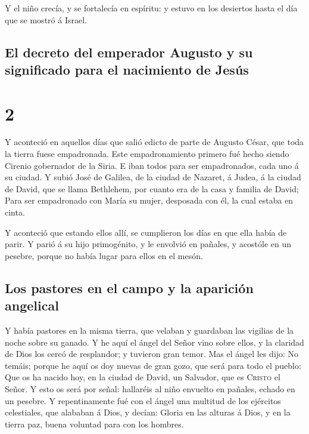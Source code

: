  Y el niño crecía, y se fortalecía en espíritu: y estuvo
en los desiertos hasta el día que se mostró á Israel.

\hypertarget{el-decreto-del-emperador-augusto-y-su-significado-para-el-nacimiento-de-jesuxfas}{%
\subsection{El decreto del emperador Augusto y su significado para el
nacimiento de
Jesús}\label{el-decreto-del-emperador-augusto-y-su-significado-para-el-nacimiento-de-jesuxfas}}

\hypertarget{section-1}{%
\section{2}\label{section-1}}

 Y aconteció en aquellos días que salió edicto de parte de
Augusto César, que toda la tierra fuese empadronada.  Este
empadronamiento primero fué hecho siendo Cirenio gobernador de la Siria.
 E iban todos para ser empadronados, cada uno á su ciudad.
 Y subió José de Galilea, de la ciudad de Nazaret, á
Judea, á la ciudad de David, que se llama Bethlehem, por cuanto era de
la casa y familia de David;  Para ser empadronado con
María su mujer, desposada con él, la cual estaba en cinta.

 Y aconteció que estando ellos allí, se cumplieron los
días en que ella había de parir.  Y parió á su hijo
primogénito, y le envolvió en pañales, y acostóle en un pesebre, porque
no había lugar para ellos en el mesón.

\hypertarget{los-pastores-en-el-campo-y-la-apariciuxf3n-angelical}{%
\subsection{Los pastores en el campo y la aparición
angelical}\label{los-pastores-en-el-campo-y-la-apariciuxf3n-angelical}}

 Y había pastores en la misma tierra, que velaban y
guardaban las vigilias de la noche sobre su ganado.  Y he
aquí el ángel del Señor vino sobre ellos, y la claridad de Dios los
cercó de resplandor; y tuvieron gran temor.  Mas el ángel
les dijo: No temáis; porque he aquí os doy nuevas de gran gozo, que será
para todo el pueblo:  Que os ha nacido hoy, en la ciudad
de David, un Salvador, que es \textsc{Cristo} el Señor. 
Y esto os será por señal: hallaréis al niño envuelto en pañales, echado
en un pesebre.  Y repentinamente fué con el ángel una
multitud de los ejércitos celestiales, que alababan á Dios, y decían:
 Gloria en las alturas á Dios, y en la tierra paz, buena
voluntad para con los hombres.

